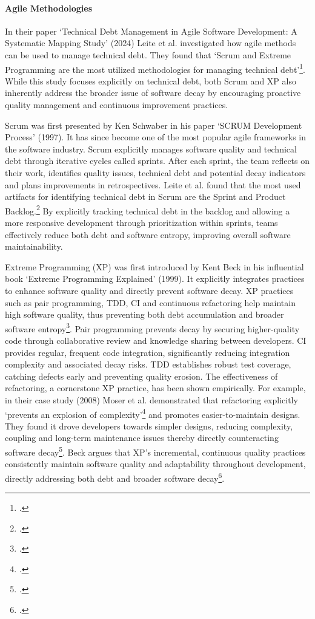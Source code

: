 \paragraph{Agile Methodologies}
In their paper `Technical Debt Management in Agile Software Development: A Systematic Mapping Study' (2024) Leite et al.
investigated how agile methods can be used to manage technical debt. They found that `Scrum and Extreme Programming are the most utilized methodologies 
for managing technical debt'\footcite[318]{leiteTechnicalDebtManagement2024}. While this study focuses explicitly on technical debt, both Scrum and \ac{XP}
also inherently address the broader issue of software decay by encouraging proactive quality management and continuous improvement practices.

Scrum was first presented by Ken Schwaber in his paper `SCRUM Development Process' (1997). 
It has since become one of the most popular agile frameworks in the software industry. Scrum explicitly manages software quality and technical debt through iterative cycles called sprints.
After each sprint, the team reflects on their work, identifies quality issues, technical debt and potential decay indicators and plans improvements in
retrospectives. Leite et al. found that the most used artifacts for identifying technical debt in Scrum are the Sprint and Product Backlog.\footcite[315]{leiteTechnicalDebtManagement2024}
By explicitly tracking technical debt in the backlog and allowing a more responsive development through prioritization within sprints, teams effectively reduce both debt and software entropy, improving overall software maintainability.

Extreme Programming (XP) was first introduced by Kent Beck in his influential book `Extreme Programming Explained' (1999).
It explicitly integrates practices to enhance software quality and directly prevent software decay.
\ac{XP} practices such as pair programming, \ac{TDD}, \ac{CI} and continuous refactoring help maintain high software quality, thus preventing both debt accumulation
and broader software entropy\footcite[5-6]{beckExtremeProgrammingExplained1999}.
Pair programming prevents decay by securing higher-quality code through collaborative review and knowledge sharing between developers.
\ac{CI} provides regular, frequent code integration, significantly reducing integration complexity and associated decay risks.
\ac{TDD} establishes robust test coverage, catching defects early and preventing quality erosion.
The effectiveness of refactoring, a cornerstone XP practice, has been shown empirically. For example, in their case study (2008) Moser et al.
demonstrated that refactoring explicitly `prevents an explosion of complexity'\footcite[262]{moserCaseStudyImpact2008}
and promotes easier-to-maintain designs.
They found it drove developers towards simpler designs, reducing complexity, coupling and long-term maintenance issues thereby directly counteracting software decay\footcite[262]{moserCaseStudyImpact2008}.
Beck argues that \ac{XP}'s incremental, continuous quality practices consistently maintain software quality and adaptability throughout development, directly addressing both debt and broader software decay\footcite[5-7]{beckExtremeProgrammingExplained1999}.

